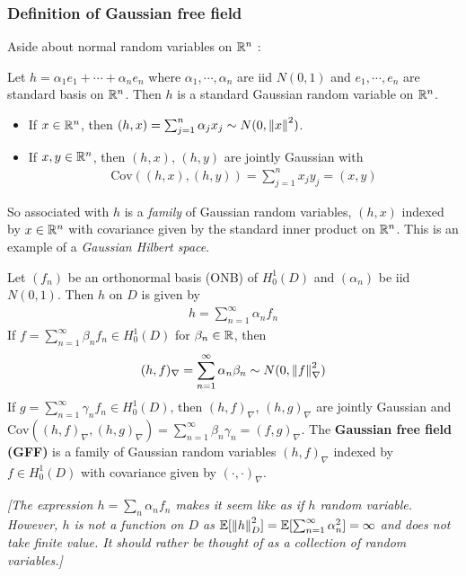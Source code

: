 \documentclass[12pt,a4paper]{article}
\begin{document}
\subsubsection*{Definition of Gaussian free field}

Aside about normal random variables on $\mathbb{R}^n$ :

Let $h= \alpha_1 e_1 + \cdots + \alpha_n e_n$ where $\alpha_1, \cdots, \alpha_n$ are iid $N(0,1)$ and $e_1,\cdots, e_n$ are standard basis on $\mathbb{R}^n$. Then $h$ is a standard Gaussian random variable on $\mathbb{R}^n$.
\begin{itemize}
\item If $x\in \mathbb{R}^n$, then $(h, x) = \sum_{j=1}^n \alpha_j x_j \sim N(0, \snorms{x}{}^2)$.
\item If $x,y\in \mathbb{R}^n$, then $(h,x)$, $(h,y)$ are jointly Gaussian with
\begin{align*}
\text{Cov}((h,x), (h,y)) = \sum_{j=1}^n x_j y_j = (x,y)
\end{align*}
\end{itemize}
So associated with $h$ is a \emph{family} of Gaussian random variables, $(h,x)$ indexed by $x\in \mathbb{R}^n$ with covariance given by the standard inner product on $\mathbb{R}^n$. This is an example of a \emph{Gaussian Hilbert space}.
\s

 Let $(f_n)$ be an orthonormal basis (ONB) of $H_0^1(D)$ and $(\alpha_n)$ be iid $N(0,1)$. Then $h$ on $D$ is given by
\begin{align*}
h = \sum_{n=1}^{\infty} \alpha_n f_n
\end{align*}
If $f= \sum_{n=1}^{\infty} \beta_n f_n \in H_0^1(D)$ for $\beta_n \in \mathbb{R}$, then
\begin{align*}
(h, f)_{\nabla} = \sum_{n=1}^{\infty} \alpha_n \beta_n \sim N(0, \snorms{f}{\nabla}^2)
\end{align*}
If  $g= \sum_{n=1}^{\infty} \gamma_n f_n \in H_0^1(D)$, then $(h, f)_{\nabla}$, $(h,g)_{\nabla}$ are jointly Gaussian and $\text{Cov}((h,f)_{\nabla}, (h,g)_{\nabla}) = \sum_{n=1}^{\infty} \beta_n \gamma_n = (f,g)_{\nabla}$. The \textbf{Gaussian free field (GFF)} is a family of Gaussian random variables $(h,f)_{\nabla}$ indexed by $f\in H_0^1(D)$ with covariance given by $(\cdot, \cdot)_{\nabla}$.

\emph{[The expression $h =\sum_n \alpha_n f_n$ makes it seem like as if $h$ random variable. However, $h$ is not a function on $D$ as $\avg[\snorms{h}{D}^2] = \avg[\sum_{n=1}^{\infty} \alpha_n^2] = \infty$ and does not take finite value. It should rather be thought of as a collection of random variables.]}
\s
\end{document}
